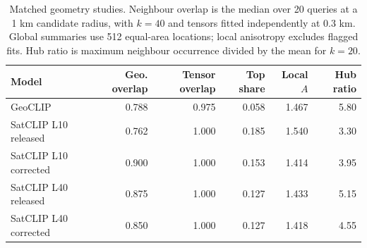 \begin{table}[htbp]\centering\small
\caption{Matched geometry studies. Neighbour overlap is the median over 20 queries at a 1 km candidate radius, with $k=40$ and tensors fitted independently at 0.3 km. Global summaries use 512 equal-area locations; local anisotropy excludes flagged fits. Hub ratio is maximum neighbour occurrence divided by the mean for $k=20$.}
\label{tab:geometrycases}
\begin{tabular}{@{}lrrrrr@{}}\toprule
Model&Geo. overlap&Tensor overlap&Top share&Local $A$&Hub ratio\\\midrule
GeoCLIP&0.788&0.975&0.058&1.467&5.80\\
SatCLIP L10 released&0.762&1.000&0.185&1.540&3.30\\
SatCLIP L10 corrected&0.900&1.000&0.153&1.414&3.95\\
SatCLIP L40 released&0.875&1.000&0.127&1.433&5.15\\
SatCLIP L40 corrected&0.850&1.000&0.127&1.418&4.55\\
\bottomrule\end{tabular}
\end{table}
